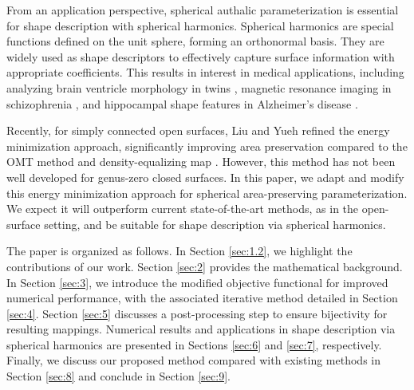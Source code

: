 \documentclass{article}
\numberwithin{equation}{section}
\begin{document}
From an application perspective, spherical authalic parameterization is essential for shape description with spherical harmonics. Spherical harmonics \cite{Byer59} are special functions defined on the unit sphere, forming an orthonormal basis. They are widely used as shape descriptors \cite{BrGK95} to effectively capture surface information with appropriate coefficients. This results in interest in medical applications, including analyzing brain ventricle morphology in twins \cite{GeSJ01}, magnetic resonance imaging in schizophrenia \cite{StLP04}, and hippocampal shape features in Alzheimer's disease \cite{GeCC09, ChLS20}.

Recently, for simply connected open surfaces, Liu and Yueh \cite{LiYu24} refined the energy minimization approach, significantly improving area preservation compared to the OMT method \cite{ZhSG13} and density-equalizing map \cite{ChRy18}. However, this method has not been well developed for genus-zero closed surfaces. In this paper, we adapt and modify this energy minimization approach for spherical area-preserving parameterization. We expect it will outperform current state-of-the-art methods, as in the open-surface setting, and be suitable for shape description via spherical harmonics.

The paper is organized as follows. In Section \ref{sec:1.2}, we highlight the contributions of our work. Section \ref{sec:2} provides the mathematical background. In Section \ref{sec:3}, we introduce the modified objective functional for improved numerical performance, with the associated iterative method detailed in Section \ref{sec:4}. Section \ref{sec:5} discusses a post-processing step to ensure bijectivity for resulting mappings. Numerical results and applications in shape description via spherical harmonics are presented in Sections \ref{sec:6} and \ref{sec:7}, respectively. Finally, we discuss our proposed method compared with existing methods in Section \ref{sec:8} and conclude in Section \ref{sec:9}.
\end{document}
